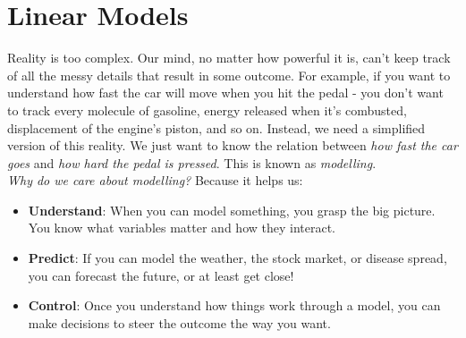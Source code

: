 \chapter{Linear Models}

Reality is too complex. Our mind, no matter how powerful it is, can't keep track of all the messy details that result in some outcome. For example, if you want to understand how fast the car will move when you hit the pedal - you don't want to track every molecule of gasoline, energy released when it's combusted, displacement of the engine's piston, and so on. Instead, we need a simplified version of this reality. We just want to know the relation between \textit{how fast the car goes} and \textit{how hard the pedal is pressed}. This is known as \textit{modelling}.\\

\textit{Why do we care about modelling?} Because it helps us: 

\begin{itemize}
    \item \textbf{Understand}: When you can model something, you grasp the big picture. You know what variables matter and how they interact.
    \item \textbf{Predict}: If you can model the weather, the stock market, or disease spread, you can forecast the future, or at least get close!
    \item \textbf{Control}: Once you understand how things work through a model, you can make decisions to steer the outcome the way you want.
\end{itemize}



